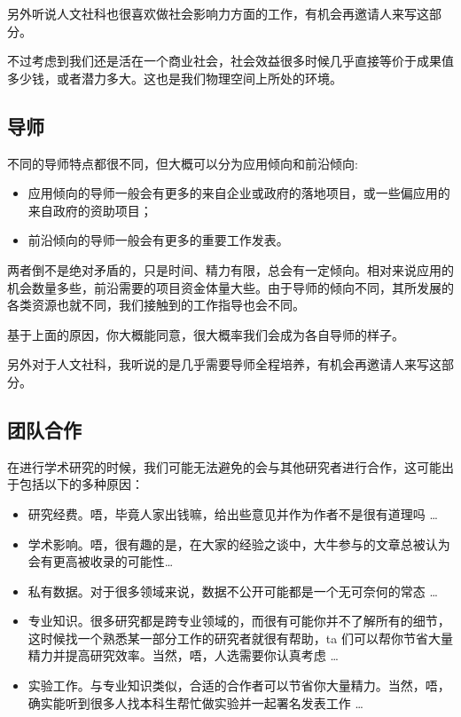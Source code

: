 另外听说人文社科也很喜欢做社会影响力方面的工作，有机会再邀请人来写这部分。

不过考虑到我们还是活在一个商业社会，社会效益很多时候几乎直接等价于成果值多少钱，或者潜力多大。这也是我们物理空间上所处的环境。


\subsection{导师}
不同的导师特点都很不同，但大概可以分为应用倾向和前沿倾向:
\begin{itemize}
    \item 应用倾向的导师一般会有更多的来自企业或政府的落地项目，或一些偏应用的来自政府的资助项目；
    \item 前沿倾向的导师一般会有更多的重要工作发表。
\end{itemize}

\vspace{\baselineskip}

两者倒不是绝对矛盾的，只是时间、精力有限，总会有一定倾向。相对来说应用的机会数量多些，前沿需要的项目资金体量大些。由于导师的倾向不同，其所发展的各类资源也就不同，我们接触到的工作指导也会不同。

基于上面的原因，你大概能同意，很大概率我们会成为各自导师的样子。

另外对于人文社科，我听说的是几乎需要导师全程培养，有机会再邀请人来写这部分。

\subsection{团队合作}
\label{subsection.teamwork}
在进行学术研究的时候，我们可能无法避免的会与其他研究者进行合作，这可能出于包括以下的多种原因：
\begin{itemize}
    \item 研究经费。唔，毕竟人家出钱嘛，给出些意见并作为作者不是很有道理吗 \dots
    \item 学术影响。唔，很有趣的是，在大家的经验之谈中，大牛参与的文章总被认为会有更高被收录的可能性\dots
    \item 私有数据。对于很多领域来说，数据不公开可能都是一个无可奈何的常态 \dots
    \item 专业知识。很多研究都是跨专业领域的，而很有可能你并不了解所有的细节，这时候找一个熟悉某一部分工作的研究者就很有帮助，ta 们可以帮你节省大量精力并提高研究效率。当然，唔，人选需要你认真考虑 \dots
    \item 实验工作。与专业知识类似，合适的合作者可以节省你大量精力。当然，唔，确实能听到很多人找本科生帮忙做实验并一起署名发表工作 \dots
\end{itemize}


